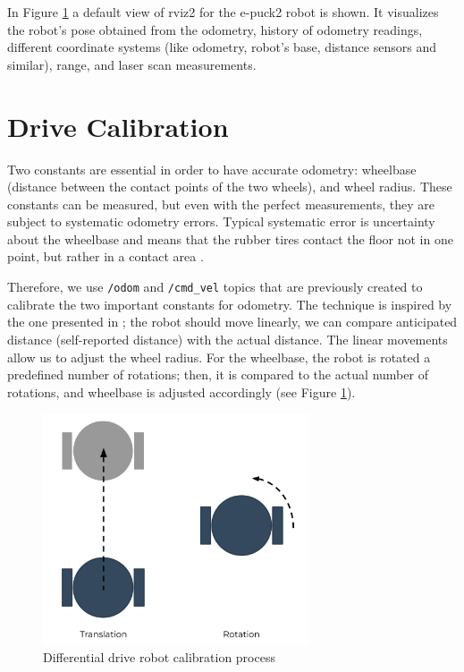 In Figure \ref{fig:demos:rviz} a default view of \acs{rviz2} for the e-puck2 robot is shown.
It visualizes the robot's pose obtained from the odometry, history of odometry readings, different coordinate systems (like odometry, robot's base, distance sensors and similar), range, and laser scan measurements.

\section{Drive Calibration}

Two constants are essential in order to have accurate odometry: wheelbase (distance between the contact points of the two wheels), and wheel radius.
These constants can be measured, but even with the perfect measurements, they are subject to systematic odometry errors. 
Typical systematic error is uncertainty about the wheelbase and means that the rubber tires contact the floor not in one point, but rather in a contact area \cite{borenstein_measurement_1996}.

Therefore, we use \texttt{/odom} and \texttt{/cmd\_vel} topics that are previously created to calibrate the two important constants for odometry.
The technique is inspired by the one presented in \cite{borenstein_measurement_1996}; the robot should move linearly, we can compare anticipated distance (self-reported distance) with the actual distance.
The linear movements allow us to adjust the wheel radius.
For the wheelbase, the robot is rotated a predefined number of rotations; then, it is compared to the actual number of rotations, and wheelbase is adjusted accordingly (see Figure \ref{fig:demos:rviz}).

\begin{figure}[H]
    \centering
    \includegraphics[width=0.7\textwidth]{demos/figures/calibration.pdf}
    \caption{Differential drive robot calibration process}
    \label{fig:demos:rviz}
\end{figure}

